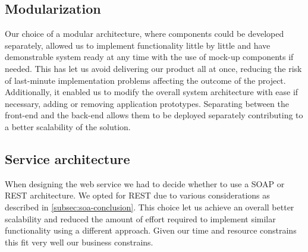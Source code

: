 \subsection{Modularization}
Our choice of a modular architecture, where components could be developed separately,
allowed us to implement functionality little by little and have demonstrable
system ready at any time with the use of mock-up components if needed.
This has let us avoid delivering our product all at once, reducing the risk
of last-minute implementation problems affecting the outcome of the project.
Additionally, it enabled us to modify the overall system architecture with ease
if necessary, adding or removing application prototypes.
Separating between the front-end and the back-end allows them to be deployed
separately contributing to a better scalability of the solution.

\subsection{Service architecture}

When designing the web service we had to decide whether to use a SOAP or REST architecture.
We opted for REST due to various considerations as described in \ref{subsec:soa-conclusion}.
This choice let us achieve an overall better scalability and reduced the amount of effort
required to implement similar functionality using a different approach.
Given our time and resource constrains this fit very well our business constrains.

